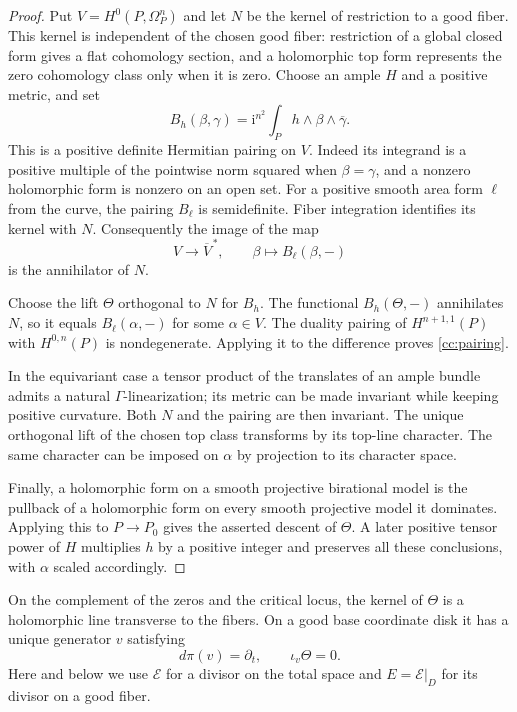 \begin{proof}
Put $V=H^0(P,\Omega_P^n)$ and let $N$ be the kernel of restriction to a
good fiber.  This kernel is independent of the chosen good fiber:
restriction of a global closed form gives a flat cohomology section, and
a holomorphic top form represents the zero cohomology class only when
it is zero.  Choose an ample $H$ and a positive metric, and set
\[
 B_h(\beta,\gamma)=\mathrm{i}^{n^2}
             \int_P h\wedge\beta\wedge\overline\gamma.
\]
This is a positive definite Hermitian pairing on $V$.  Indeed its
integrand is a positive multiple of the pointwise norm squared when
$\beta=\gamma$, and a nonzero holomorphic form is nonzero on an open
set.  For a positive smooth area form $\ell$ from the curve, the pairing
$B_\ell$ is semidefinite.  Fiber integration identifies its kernel with
$N$.  Consequently the image of the map
\[
       V\longrightarrow\overline V^{\,*},\qquad
       \beta\longmapsto B_\ell(\beta,-)
\]
is the annihilator of $N$.

Choose the lift $\Theta$ orthogonal to $N$ for $B_h$.  The functional
$B_h(\Theta,-)$ annihilates $N$, so it equals $B_\ell(\alpha,-)$ for
some $\alpha\in V$.  The duality pairing of $H^{n+1,1}(P)$ with
$H^{0,n}(P)$ is nondegenerate.  Applying it to the difference proves
\eqref{cc:pairing}.

In the equivariant case a tensor product of the translates of an ample
bundle admits a natural $\Gamma$-linearization; its metric can be made
invariant while keeping positive curvature.  Both $N$ and the pairing
are then invariant.  The unique orthogonal lift of the chosen top class
transforms by its top-line character.  The same character can be imposed
on $\alpha$ by projection to its character space.

Finally, a holomorphic form on a smooth projective birational model is
the pullback of a holomorphic form on every smooth projective model it
dominates.  Applying this to $P\to P_0$ gives the asserted descent of
$\Theta$.  A later positive tensor power of $H$ multiplies $h$ by a
positive integer and preserves all these conclusions, with $\alpha$
scaled accordingly.
\end{proof}

On the complement of the zeros and the critical locus, the kernel of
$\Theta$ is a holomorphic line transverse to the fibers.  On a good base
coordinate disk it has a unique generator $v$ satisfying
\begin{equation}
        d\pi(v)=\partial_t,\qquad \iota_v\Theta=0.
\label{cc:kernel}
\end{equation}
Here and below we use $\mathcal E$ for a divisor on the total space and
$E=\mathcal E|_D$ for its divisor on a good fiber.

